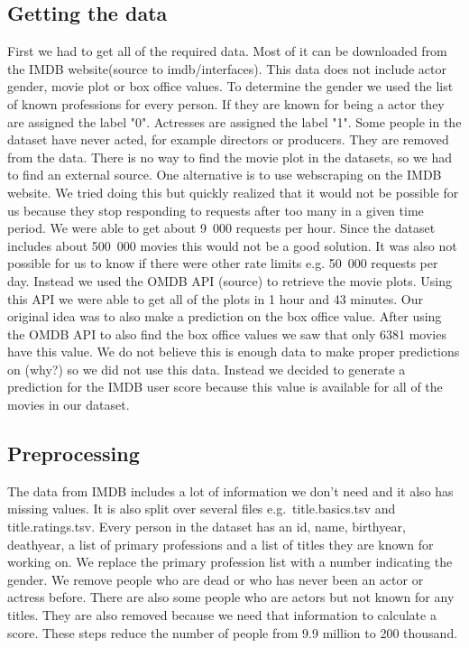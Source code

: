 
\subsection{Getting the data} 
First we had to get all of the required data. Most of it can be downloaded from the IMDB website(source to imdb/interfaces). This data does not include actor gender, movie plot or box office values. To determine the gender we used the list of known professions for every person. If they are known for being a actor they are assigned the label "0". Actresses are assigned the label "1". Some people in the dataset have never acted, for example directors or producers. They are removed from the data. There is no way to find the movie plot in the datasets, so we had to find an external source. One alternative is to use webscraping on the IMDB website. We tried doing this but quickly realized that it would not be possible for us because they stop responding to requests after too many in a given time period. We were able to get about 9~000 requests per hour. Since the dataset includes about 500~000 movies this would not be a good solution. It was also not possible for us to know if there were other rate limits e.g. 50~000 requests per day. Instead we used the OMDB API (source) to retrieve the movie plots. Using this API we were able to get all of the plots in 1 hour and 43 minutes. Our original idea was to also make a prediction on the box office value. After using the OMDB API to also find the box office values we saw that only 6381 movies have this value. We do not believe this is enough data to make proper predictions on (why?) so we did not use this data. Instead we decided to generate a prediction for the IMDB user score because this value is available for all of the movies in our dataset.

\subsection{Preprocessing}
The data from IMDB includes a lot of information we don't need and it also has missing values. It is also split over several files e.g.~title.basics.tsv and title.ratings.tsv. Every person in the dataset has an id, name, birthyear, deathyear, a list of primary professions and a list of titles they are known for working on. We replace the primary profession list with a number indicating the gender. We remove people who are dead or who has never been an actor or actress before. There are also some people who are actors but not known for any titles. They are also removed because we need that information to calculate a score. These steps reduce the number of people from 9.9 million to 200 thousand.

